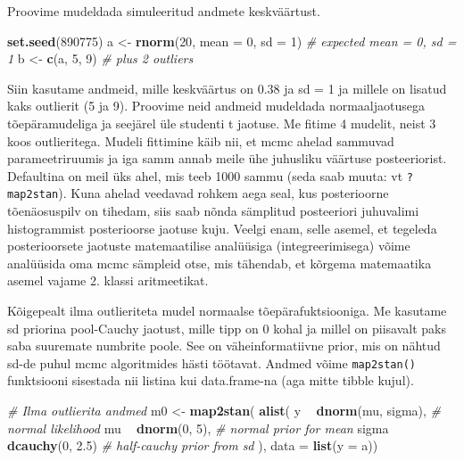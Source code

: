 \documentclass[]{book}
\newenvironment{Shaded}{\begin{snugshade}}{\end{snugshade}}
\newcommand{\KeywordTok}[1]{\textcolor[rgb]{0.13,0.29,0.53}{\textbf{#1}}}
\newcommand{\DataTypeTok}[1]{\textcolor[rgb]{0.13,0.29,0.53}{#1}}
\newcommand{\DecValTok}[1]{\textcolor[rgb]{0.00,0.00,0.81}{#1}}
\newcommand{\FloatTok}[1]{\textcolor[rgb]{0.00,0.00,0.81}{#1}}
\newcommand{\StringTok}[1]{\textcolor[rgb]{0.31,0.60,0.02}{#1}}
\newcommand{\CommentTok}[1]{\textcolor[rgb]{0.56,0.35,0.01}{\textit{#1}}}
\newcommand{\OperatorTok}[1]{\textcolor[rgb]{0.81,0.36,0.00}{\textbf{#1}}}
\newcommand{\NormalTok}[1]{#1}
\begin{document}
Proovime mudeldada simuleeritud andmete keskväärtust.

\begin{Shaded}
\begin{Highlighting}[]
\KeywordTok{set.seed}\NormalTok{(}\DecValTok{890775}\NormalTok{)}
\NormalTok{a <-}\StringTok{ }\KeywordTok{rnorm}\NormalTok{(}\DecValTok{20}\NormalTok{, }\DataTypeTok{mean =} \DecValTok{0}\NormalTok{, }\DataTypeTok{sd =} \DecValTok{1}\NormalTok{) }\CommentTok{# expected mean = 0, sd = 1}
\NormalTok{b <-}\StringTok{ }\KeywordTok{c}\NormalTok{(a, }\DecValTok{5}\NormalTok{, }\DecValTok{9}\NormalTok{) }\CommentTok{# plus 2 outliers}
\end{Highlighting}
\end{Shaded}

Siin kasutame andmeid, mille keskväärtus on 0.38 ja sd = 1 ja millele on
lisatud kaks outlierit (5 ja 9). Proovime neid andmeid mudeldada
normaaljaotusega tõepäramudeliga ja seejärel üle studenti t jaotuse. Me
fitime 4 mudelit, neist 3 koos outlieritega. Mudeli fittimine käib nii,
et mcmc ahelad sammuvad parameetriruumis ja iga samm annab meile ühe
juhusliku väärtuse posteeriorist. Defaultina on meil üks ahel, mis teeb
1000 sammu (seda saab muuta: vt \texttt{?map2stan}). Kuna ahelad
veedavad rohkem aega seal, kus posterioorne tõenäosuspilv on tihedam,
siis saab nõnda sämplitud posteeriori juhuvalimi histogrammist
posterioorse jaotuse kuju. Veelgi enam, selle asemel, et tegeleda
posterioorsete jaotuste matemaatilise analüüsiga (integreerimisega)
võime analüüsida oma mcmc sämpleid otse, mis tähendab, et kõrgema
matemaatika asemel vajame 2. klassi aritmeetikat.

Kõigepealt ilma outlieriteta mudel normaalse tõepärafuktsiooniga. Me
kasutame sd priorina pool-Cauchy jaotust, mille tipp on 0 kohal ja
millel on piisavalt paks saba suuremate numbrite poole. See on
väheinformatiivne prior, mis on nähtud sd-de puhul mcmc algoritmides
hästi töötavat. Andmed võime \texttt{map2stan()} funktsiooni sisestada
nii listina kui data.frame-na (aga mitte tibble kujul).

\begin{Shaded}
\begin{Highlighting}[]
\CommentTok{# Ilma outlierita andmed}
\NormalTok{m0 <-}\StringTok{ }\KeywordTok{map2stan}\NormalTok{(}
  \KeywordTok{alist}\NormalTok{(}
\NormalTok{    y }\OperatorTok{~}\StringTok{ }\KeywordTok{dnorm}\NormalTok{(mu, sigma),  }\CommentTok{# normal likelihood}
\NormalTok{    mu }\OperatorTok{~}\StringTok{ }\KeywordTok{dnorm}\NormalTok{(}\DecValTok{0}\NormalTok{, }\DecValTok{5}\NormalTok{), }\CommentTok{# normal prior for mean}
\NormalTok{    sigma }\OperatorTok{~}\StringTok{ }\KeywordTok{dcauchy}\NormalTok{(}\DecValTok{0}\NormalTok{, }\FloatTok{2.5}\NormalTok{) }\CommentTok{# half-cauchy prior from sd }
\NormalTok{  ),}
  \DataTypeTok{data =} \KeywordTok{list}\NormalTok{(}\DataTypeTok{y =}\NormalTok{ a))}
\end{Highlighting}
\end{Shaded}
\end{document}
